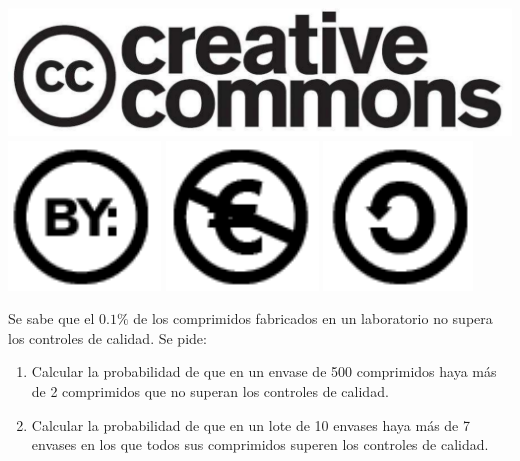 \documentclass[aspectratio=149,10pt,xcolor=dvipsnames,t]{beamer}
\begin{document}
\begin{frame}[c]
\begin{center}
\biskip
\includegraphics[scale=0.07]{img/cc-logo}
\includegraphics[scale=0.2]{img/cc-by}
\includegraphics[scale=0.2]{img/cc-e}
\includegraphics[scale=0.2]{img/cc-c}
\end{center}
\end{frame}

\begin{frame}[c]
\large
Se sabe que el $0.1\%$ de los comprimidos fabricados en un laboratorio no supera los controles de calidad. 
Se pide:
\begin{enumerate}
\item Calcular la probabilidad de que en un envase de 500 comprimidos haya más de 2 comprimidos que no superan los controles de calidad.
\item Calcular la probabilidad de que en un lote de 10 envases haya más de 7 envases en los que todos sus comprimidos superen los controles de calidad. 
\end{enumerate}
\end{frame}
\end{document}
